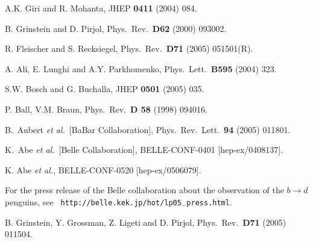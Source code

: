 \documentclass[12pt]{article}
\begin{document}
\begin{thebibliography}{999}
A.K. Giri and R. Mohanta,
  { JHEP} {\bf 0411} (2004) 084.
  
B. Grinstein and D. Pirjol,
{ Phys.\ Rev.}~{\bf D62} (2000) 093002.

R. Fleischer and S. Recksiegel,
  { Phys.\ Rev.}~{\bf D71} (2005) 051501(R).

A. Ali, E. Lunghi and A.Y. Parkhomenko,
{ Phys.\ Lett.}~{\bf B595} (2004) 323.

S.W. Bosch and G. Buchalla,
  { JHEP} {\bf 0501} (2005) 035.

P. Ball, V.M. Braun,
{ Phys.\ Rev.}~{\bf D 58} (1998) 094016.

B.~Aubert {\it et al.}\  [BaBar Collaboration],
{ Phys.\ Rev.\ Lett.}~{\bf 94} (2005) 011801.

K.~Abe {\it et al.}\  [Belle Collaboration],
BELLE-CONF-0401 [hep-ex/0408137].

K. Abe {\it et al.},
  BELLE-CONF-0520 [hep-ex/0506079].
  
For the press release of the Belle collaboration about the 
observation of the $b\to d$ penguins, see {\tt 
http://belle.kek.jp/hot/lp05$\mbox{}_-$press.html}.

B. Grinstein, Y. Grossman, Z. Ligeti and D. Pirjol,
  { Phys.\ Rev.}~{\bf D71} (2005) 011504.


\end{thebibliography}
\end{document}
